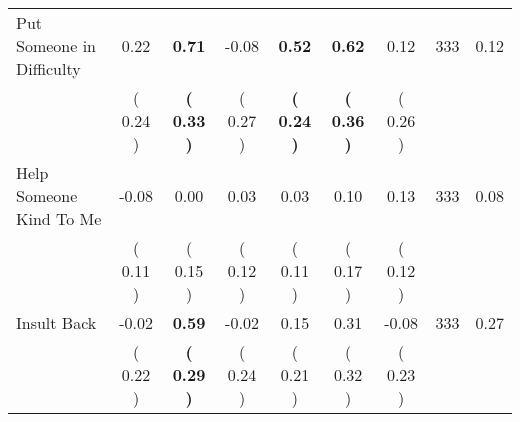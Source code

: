 \begin{tabular}{lcccccccc}
Put Someone in Difficulty &      0.22 & \textbf{     0.71} &     -0.08 & \textbf{     0.52} & \textbf{     0.62} &      0.12 & 333 &       0.12 \\ 
 & (     0.24 ) & \textbf{(     0.33 )} & (     0.27 ) & \textbf{(     0.24 )} & \textbf{(     0.36 )} & (     0.26 ) & \\
Help Someone Kind To Me &     -0.08 &      0.00 &      0.03 &      0.03 &      0.10 &      0.13 & 333 &       0.08 \\ 
 & (     0.11 ) & (     0.15 ) & (     0.12 ) & (     0.11 ) & (     0.17 ) & (     0.12 ) & \\
Insult Back &     -0.02 & \textbf{     0.59} &     -0.02 &      0.15 &      0.31 &     -0.08 & 333 &       0.27 \\ 
 & (     0.22 ) & \textbf{(     0.29 )} & (     0.24 ) & (     0.21 ) & (     0.32 ) & (     0.23 ) & \\
\bottomrule
\end{tabular}

